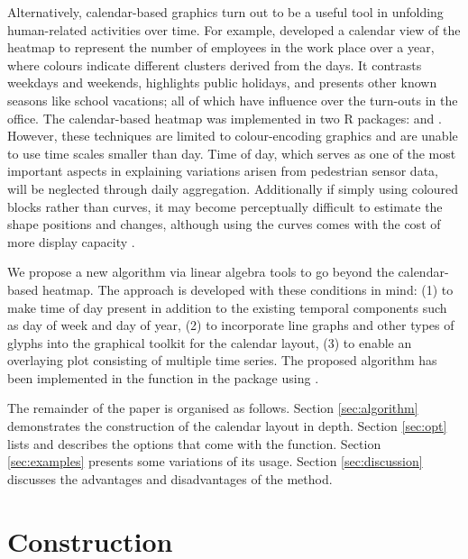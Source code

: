 \documentclass[article]{jss}
\begin{document}
Alternatively, calendar-based graphics turn out to be a useful tool in
unfolding human-related activities over time. For example,
\citet{VanWijkCluster1999} developed a calendar view of the heatmap to
represent the number of employees in the work place over a year, where
colours indicate different clusters derived from the days. It contrasts
weekdays and weekends, highlights public holidays, and presents other
known seasons like school vacations; all of which have influence over
the turn-outs in the office. The calendar-based heatmap was implemented
in two R packages:  \citep{R-ggTimeSeries} and
 \citep{R-ggcal}. However, these techniques are limited to
colour-encoding graphics and are unable to use time scales smaller than
day. Time of day, which serves as one of the most important aspects in
explaining variations arisen from pedestrian sensor data, will be
neglected through daily aggregation. Additionally if simply using
coloured blocks rather than curves, it may become perceptually difficult
to estimate the shape positions and changes, although using the curves
comes with the cost of more display capacity
\citep{cleveland1984graphical, lam2007overview}.

We propose a new algorithm via linear algebra tools to go beyond the
calendar-based heatmap. The approach is developed with these conditions
in mind: (1) to make time of day present in addition to the existing
temporal components such as day of week and day of year, (2) to
incorporate line graphs and other types of glyphs into the graphical
toolkit for the calendar layout, (3) to enable an overlaying plot
consisting of multiple time series. The proposed algorithm has been
implemented in the  function in the 
package \citep{R-sugrrants} using  \citep{R-base}.

The remainder of the paper is organised as follows. Section
\ref{sec:algorithm} demonstrates the construction of the calendar layout
in depth. Section \ref{sec:opt} lists and describes the options that
come with the  function. Section \ref{sec:examples}
presents some variations of its usage. Section \ref{sec:discussion}
discusses the advantages and disadvantages of the method.

\section{Construction}\label{construction}

\label{sec:algorithm}
\end{document}
